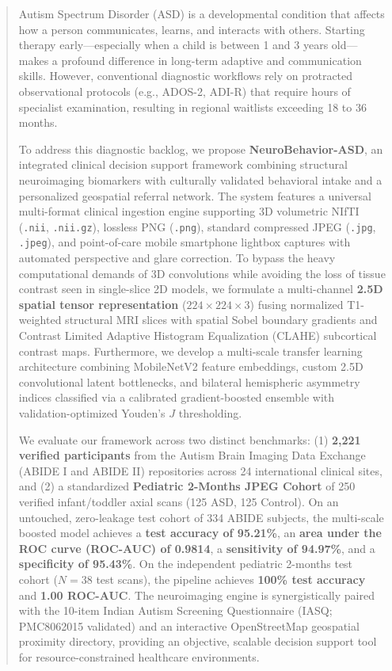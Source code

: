 \documentclass[conference]{IEEEtran}
\begin{document}
\begin{abstract}
Autism Spectrum Disorder (ASD) is a developmental condition that affects how a person communicates, learns, and interacts with others. Starting therapy early---especially when a child is between 1 and 3 years old---makes a profound difference in long-term adaptive and communication skills. However, conventional diagnostic workflows rely on protracted observational protocols (e.g., ADOS-2, ADI-R) that require hours of specialist examination, resulting in regional waitlists exceeding 18 to 36 months.

To address this diagnostic backlog, we propose \textbf{NeuroBehavior-ASD}, an integrated clinical decision support framework combining structural neuroimaging biomarkers with culturally validated behavioral intake and a personalized geospatial referral network. The system features a universal multi-format clinical ingestion engine supporting 3D volumetric NIfTI (\texttt{.nii}, \texttt{.nii.gz}), lossless PNG (\texttt{.png}), standard compressed JPEG (\texttt{.jpg}, \texttt{.jpeg}), and point-of-care mobile smartphone lightbox captures with automated perspective and glare correction. To bypass the heavy computational demands of 3D convolutions while avoiding the loss of tissue contrast seen in single-slice 2D models, we formulate a multi-channel \textbf{2.5D spatial tensor representation} ($224 \times 224 \times 3$) fusing normalized T1-weighted structural MRI slices with spatial Sobel boundary gradients and Contrast Limited Adaptive Histogram Equalization (CLAHE) subcortical contrast maps. Furthermore, we develop a multi-scale transfer learning architecture combining MobileNetV2 feature embeddings, custom 2.5D convolutional latent bottlenecks, and bilateral hemispheric asymmetry indices classified via a calibrated gradient-boosted ensemble with validation-optimized Youden's $J$ thresholding.

We evaluate our framework across two distinct benchmarks: (1) \textbf{2,221 verified participants} from the Autism Brain Imaging Data Exchange (ABIDE I and ABIDE II) repositories across 24 international clinical sites, and (2) a standardized \textbf{Pediatric 2-Months JPEG Cohort} of 250 verified infant/toddler axial scans (125 ASD, 125 Control). On an untouched, zero-leakage test cohort of 334 ABIDE subjects, the multi-scale boosted model achieves a \textbf{test accuracy of 95.21\%}, an \textbf{area under the ROC curve (ROC-AUC) of 0.9814}, a \textbf{sensitivity of 94.97\%}, and a \textbf{specificity of 95.43\%}. On the independent pediatric 2-months test cohort ($N = 38$ test scans), the pipeline achieves \textbf{100\% test accuracy} and \textbf{1.00 ROC-AUC}. The neuroimaging engine is synergistically paired with the 10-item Indian Autism Screening Questionnaire (IASQ; PMC8062015 validated) and an interactive OpenStreetMap geospatial proximity directory, providing an objective, scalable decision support tool for resource-constrained healthcare environments.
\end{abstract}
\end{document}
